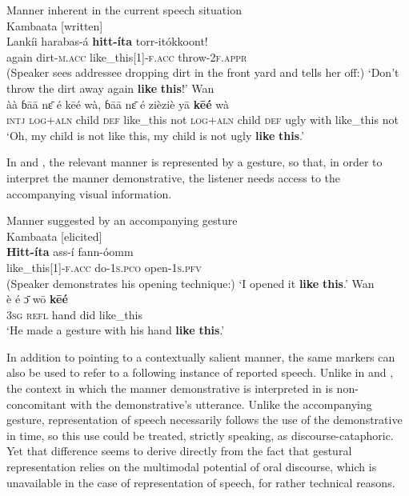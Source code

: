 \documentclass[output=paper,colorlinks,citecolor=brown]{langscibook}
\begin{document}
\ea\label{ex:nikitina:1} {Manner inherent in the current speech situation}\\
\ea\label{ex:nikitina:1a} {Kambaata [written]}\\
\gll Lankíi harabas-á \textbf{hitt-íta} torr-itókkoont!\\
     again dirt-\textsc{m.acc} like\_this[1]\textsc{{}-f.acc} throw-\textsc{2f.appr}\\
\glt (Speaker sees addressee dropping dirt in the front yard and tells her off:) ‘Don’t throw the dirt away again \textbf{like} \textbf{this}!’
\ex\label{ex:nikitina:1b} {Wan}\\
\gll àà ɓāā n\={ɛ} é kēé wà, ɓāā n\={ɛ} é zièziè yā \textbf{kēé} wà\\
     \textsc{intj} \textsc{log+aln} child \textsc{def} like\_this not \textsc{log+aln} child \textsc{def} ugly with like\_this not\\
\glt ‘Oh, my child is not like this, my child is not ugly \textbf{like} \textbf{this}.’
\z
\z

In  and , the relevant manner is represented by a gesture, so that, in order to interpret the manner demonstrative, the listener needs access to the accompanying visual information.

\ea\label{ex:nikitina:2} {Manner suggested by an accompanying gesture}\\
\ea\label{ex:nikitina:2a} {Kambaata [elicited]}\\
\gll \textbf{Hitt-íta} ass-í fann-óomm\\
     like\_this\textsc{[1]-f.acc} do-\textsc{1s.pco} open-\textsc{1s.pfv}\\
\glt (Speaker demonstrates his opening technique:) ‘I opened it \textbf{like} \textbf{this}.’ 
\ex\label{ex:nikitina:2b} {Wan}\\
\gll è é \={ɔ} wō \textbf{kēé}\\
     \textsc{3sg} \textsc{refl} hand did like\_this\\
\glt ‘He made a gesture with his hand \textbf{like} \textbf{this}.’
\z
\z

In addition to pointing to a contextually salient manner, the same markers can also be used to refer to a following instance of reported speech. Unlike in  and , the context in which the manner demonstrative is interpreted in  is non-concomitant with the demonstrative’s utterance. Unlike the accompanying gesture, representation of speech necessarily follows the use of the demonstrative in time, so this use could be treated, strictly speaking, as discourse-cataphoric. Yet that difference seems to derive directly from the fact that gestural representation relies on the multimodal potential of oral discourse, which is unavailable in the case of representation of speech, for rather technical reasons.
\end{document}
